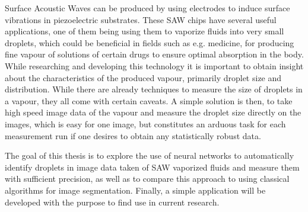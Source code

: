 Surface Acoustic Waves can be produced by using electrodes to induce surface vibrations in piezoelectric substrates. These SAW chips have several useful applications, one of them being using them to vaporize fluids into very small droplets, which could be beneficial in fields such as e.g. medicine, for producing fine vapour of solutions of certain drugs to ensure optimal absorption in the body.
While researching and developing this technology it is important to obtain insight about the characteristics of the produced vapour, primarily droplet size and distribution. While there are already techniques to measure the size of droplets in a vapour, they all come with certain caveats. A simple solution is then, to take high speed image data of the vapour and measure the droplet size directly on the images, which is easy for one image, but constitutes an arduous task for each measurement run if one desires to obtain any statistically robust data.

The goal of this thesis is to explore the use of neural networks to automatically identify droplets in image data taken of SAW vaporized fluids and measure them with sufficient precision, as well as to compare this approach to using classical algorithms for image segmentation. Finally, a simple application will be developed with the purpose to find use in current research.